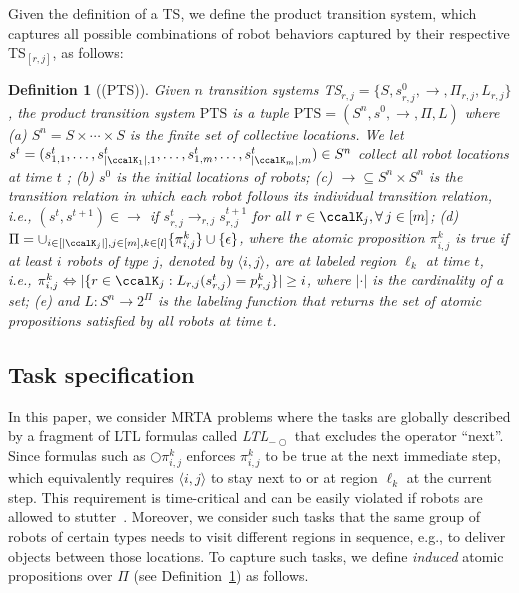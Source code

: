\documentclass[Afour,sageh,times]{sagej}
\newtheorem{defn}[thm]{Definition}
\newcommand{\ltl}{ {\it LTL}$_{-\bigcirc}$ }
\newcommand{\ag}[2]{\langle#1,#2\rangle}
\renewcommand{\ap}[3]{\mathcal{\pi}_{{#1},{#2}}^{#3}}
\begin{document}
Given the definition of a TS, we define the {product transition system}, which captures all possible combinations of robot behaviors captured by their respective TS$_{[r,j]}$, as follows:
\begin{defn}[(PTS)]\label{def:pts}
  Given $n$ transition systems TS$_{r,j} = \{S, s_{r,j}^0, \to, \Pi_{r,j}, L_{r,j}\}$, the product transition system $\text{PTS}$ is a tuple $\text{PTS} = (S^n, s^0, \to, \Pi, L)$ where (a) $S^n = S\times \cdots \times S$ is the finite set of collective locations. We let $s^t = (s_{1,1}^t, \ldots, s_{|\ccalK_1|,1}^t, \ldots, s_{1,m}^t, \ldots, s_{|\ccalK_m|, m}^t) \in S^n$ collect all robot locations at time $t$%
  ; (b) $s^0$ is the initial locations of robots; (c) $\to \subseteq S^n \times S^n$ is the transition relation in which each robot follows its individual transition relation, i.e., $(s^t, s^{t+1}) \in \to$ if $s^t_{r,j}\rightarrow_{r,j} s^{t+1}_{r,j}$ for all $r\in \ccalK_j, \forall \,j \in [m]$;
  (d) $\Pi = \cup_{i\in[|\ccalK_j|], j\in [m], k\in [l]}\{\pi_{i,j}^k\} \cup \{\epsilon\}$, where the atomic proposition $\ap{i}{j}{k}$ is true if at least $i$ robots of type $j$, denoted by $\ag{i}{j}$, are at labeled region $\ell_k$ at time $t$, i.e., $\ap{i}{j}{k} \Leftrightarrow |\{r\in \ccalK_j: L_{r,j}(s_{r,j}^t) = p_{r,j}^k \}| \geq i$, where $|\cdot|$ is the cardinality of a set; (e) and $L: S^n \to 2^{\Pi}$ is the labeling function that returns the set of atomic propositions satisfied by all robots at time $t$.
\end{defn}
\subsection{Task specification}
In this paper, we consider MRTA problems where the tasks are globally described by a fragment of LTL formulas called \ltl that excludes the operator ``next''. Since formulas such as  $\bigcirc \ap{i}{j}{k}$ enforces $\ap{i}{j}{k}$ to be true at the next immediate step, which equivalently requires $\langle i,j \rangle$ to stay next to or at region $\ell_k$ at the current step. This requirement is time-critical and can be easily violated if robots are allowed to stutter~\citep{sahin2019multirobot}. Moreover, we consider such tasks that the same group of robots of certain types needs to visit different regions in sequence, e.g., to deliver objects between those locations. To capture such tasks, we  define {\it induced} atomic propositions over $\Pi$ (see Definition~\ref{def:pts})  as follows.
\end{document}
